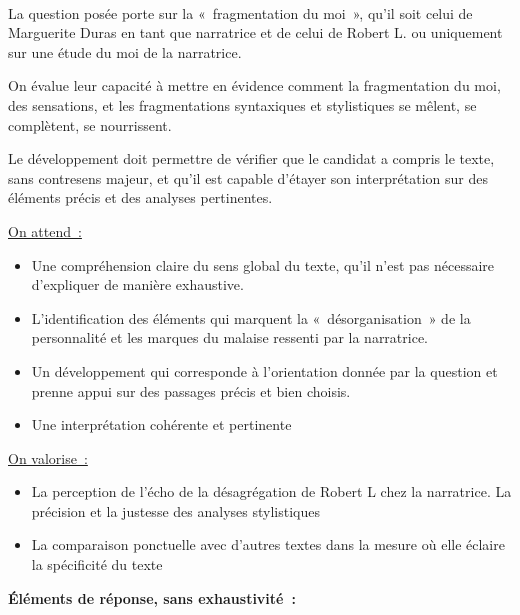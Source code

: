 \vfill{~}\newpage

{La question posée porte sur la «~fragmentation du moi~», qu'il soit celui de Marguerite Duras en
tant que narratrice et de celui de Robert L. ou uniquement sur une étude du moi de la narratrice.

On évalue leur capacité à mettre en évidence comment la fragmentation du moi, des sensations,
et les fragmentations syntaxiques et stylistiques se mêlent, se complètent, se nourrissent.

Le développement doit permettre de vérifier que le candidat a compris le texte, sans contresens
majeur, et qu'il est capable d'étayer son interprétation sur des éléments précis et des analyses
pertinentes.

\underline{On attend~:}
\begin{itemize}
\item Une compréhension claire du sens global du texte, qu'il n'est pas nécessaire d'expliquer
de manière exhaustive.
\item L'identification des éléments qui marquent la «~désorganisation~» de la personnalité et les
marques du malaise ressenti par la narratrice.
\item Un développement qui corresponde à l'orientation donnée par la question et prenne appui
sur des passages précis et bien choisis.
\item Une interprétation cohérente et pertinente
\end{itemize}

\underline{On valorise~:}
\begin{itemize}
\item La perception de l'écho de la désagrégation de Robert L chez la narratrice.
La précision et la justesse des analyses stylistiques
\item La comparaison ponctuelle avec d'autres textes dans la mesure où elle éclaire la
spécificité du texte
\end{itemize}

\bigskip

\textbf{Éléments de réponse, sans exhaustivité~:}

}
